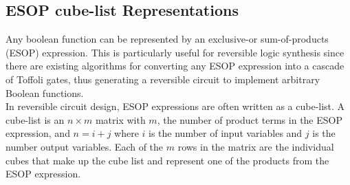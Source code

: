 \subsection{ESOP cube-list Representations}

Any boolean function can be represented by an exclusive-or sum-of-products (ESOP) expression. This is
particularly useful for reversible logic synthesis since there are existing algorithms for converting 
any ESOP expression into a cascade of Toffoli gates, thus generating a reversible circuit 
to implement arbitrary Boolean functions. \\ 


In reversible circuit design, ESOP expressions are often written as a cube-list. A cube-list is an $ n \times m $
matrix with $m$, the number of product terms in the ESOP expression, and $n = i + j$ where $i$ is the number 
of input variables and $j$ is the number output variables. Each of the $m$ rows in the matrix are the individual
cubes that make up the cube list and represent one of the products from the ESOP expression. \\

